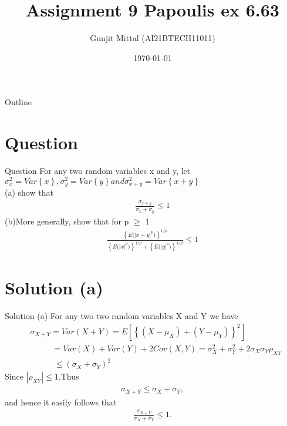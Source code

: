 \documentclass{beamer}
\title{Assignment 9 Papoulis ex 6.63}
\author{Gunjit Mittal (AI21BTECH11011)}
\date{\today}
\providecommand{\sbrak}[1]{\ensuremath{{}\left[#1\right]}}
\providecommand{\brak}[1]{\ensuremath{\left(#1\right)}}
\providecommand{\cbrak}[1]{\ensuremath{\left\{#1\right\}}}
\theoremstyle{remark}
\numberwithin{equation}{section}
\numberwithin{figure}{section}
\numberwithin{table}{section}
\begin{document}
 
\begin{frame}
  \titlepage{}
\end{frame}
\logo{}
\begin{frame}{Outline}
  \tableofcontents
\end{frame}
\section{Question}
\begin{frame}{Question}
For any two random variables x and y, let $\sigma^2_x = Var\cbrak{x},\sigma^2_y = Var\cbrak{y} and \sigma^2_{x+y} = Var\cbrak{x+y}$\\
(a) show that
\begin{align*}
    \frac{\sigma_{x+y}}{\sigma_x+\sigma_y}\leq1
\end{align*}
(b)More generally, show that for p $\geq$ 1
\begin{align*}
  \frac{\cbrak{{E(|x+y|}^p)}^{1/p}}{\cbrak{{E(|x|}^p)}^{1/p}+\cbrak{{E(|y|}^p)}^{1/p}} \leq 1
\end{align*}
\end{frame}
\section{Solution (a)} 
\begin{frame}{Solution (a)}
For any two two random variables X and Y we have 
\begin{align*}
  &\sigma_{X+Y} = Var(X+Y) = E\sbrak{\cbrak{\brak{X-\mu_X}+\brak{Y-\mu_Y}}^2}\\
  &~~~~~~~~~~~~=Var(X)+Var(Y)+2Cov(X,Y) = \sigma^2_X + \sigma^2_Y +2 \sigma_X\sigma_Y\rho_{XY}\\
  &~~~~~~~~~~~~~\leq \brak{\sigma_X+\sigma_Y}^2
\end{align*}
Since $|\rho_{XY}|\leq1$.Thus
\begin{align*}
  \sigma_{X+Y}\leq \sigma_X + \sigma_Y,
\end{align*}
and hence it easily follows that
\begin{align*}
  \frac{\sigma_{X+Y}}{\sigma_X+\sigma_Y}\leq1.
\end{align*}
\end{frame}
\end{document}

